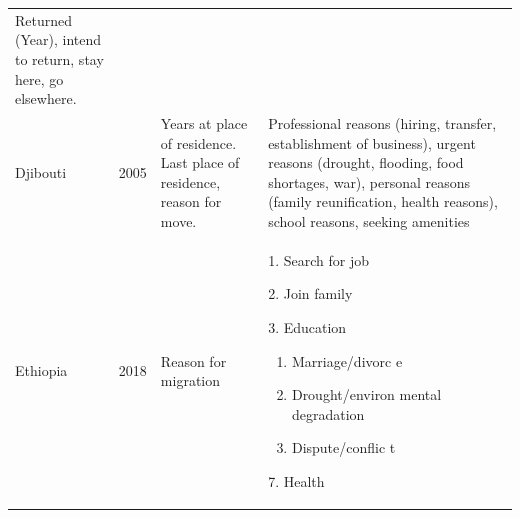 \documentclass[
]{article}
\begin{document}
\begin{longtable}[]{@{}llll@{}}
\begin{minipage}[t]{0.22\columnwidth}
Returned
(Year), intend
to return, stay
here, go
elsewhere.\strut
\end{minipage}\tabularnewline
\begin{minipage}[t]{0.22\columnwidth}\raggedright
Djibouti\strut
\end{minipage} & \begin{minipage}[t]{0.22\columnwidth}\raggedright
2005\strut
\end{minipage} & \begin{minipage}[t]{0.22\columnwidth}\raggedright
Years at place
of residence.
Last place of
residence,
reason for
move.\strut
\end{minipage} & \begin{minipage}[t]{0.22\columnwidth}\raggedright
Professional
reasons
(hiring,
transfer,
establishment
of business),
urgent reasons
(drought,
flooding, food
shortages,
war), personal
reasons (family
reunification,
health
reasons),
school reasons,
seeking
amenities\strut
\end{minipage}\tabularnewline
\begin{minipage}[t]{0.22\columnwidth}\raggedright
Ethiopia\strut
\end{minipage} & \begin{minipage}[t]{0.22\columnwidth}\raggedright
2018\strut
\end{minipage} & \begin{minipage}[t]{0.22\columnwidth}\raggedright
Reason for
migration\strut
\end{minipage} & \begin{minipage}[t]{0.22\columnwidth}\raggedright
1. Search for
job

2. Join
family

3. Education

\begin{enumerate}
\def\labelenumi{\arabic{enumi}.}
\setcounter{enumi}{3}
\item
  Marriage/divorc
  e
\item
  Drought/environ
  mental
  degradation
\item
  Dispute/conflic
  t
\end{enumerate}

7. Health


\end{minipage}
\end{longtable}
\end{document}
